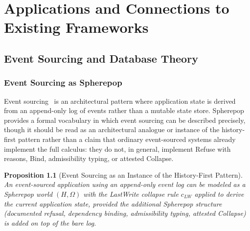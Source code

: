 \documentclass[12pt, a4paper, openany]{book}
\theoremstyle{plain}
\newtheorem{proposition}[theorem]{Proposition}
\theoremstyle{definition}
\theoremstyle{remark}
\begin{document}
\part{Applications and Connections to Existing Frameworks}

\chapter{Event Sourcing and Database Theory}

\section{Event Sourcing as Spherepop}

Event sourcing~\cite{fowler05} is an architectural pattern where application
state is derived from an append-only log of events rather than a mutable state
store. Spherepop provides a formal vocabulary in which event sourcing can be
described precisely, though it should be read as an architectural analogue or
instance of the history-first pattern rather than a claim that ordinary
event-sourced systems already implement the full calculus: they do not, in
general, implement Refuse with reasons, Bind, admissibility typing, or attested
Collapse.

\begin{proposition}[Event Sourcing as an Instance of the History-First Pattern]
An event-sourced application using an append-only event log can be modeled as
a Spherepop world $(H, \Omega)$ with the LastWrite collapse rule $c_{LW}$
applied to derive the current application state, provided the additional
Spherepop structure (documented refusal, dependency binding, admissibility
typing, attested Collapse) is added on top of the bare log.
\end{proposition}
\end{document}
